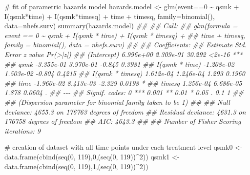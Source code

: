 \documentclass[
  10pt,
  a4paper,
]{book}
\newenvironment{Shaded}{\begin{snugshade}}{\end{snugshade}}
\newcommand{\AttributeTok}[1]{\textcolor[rgb]{0.40,0.45,0.13}{#1}}
\newcommand{\CommentTok}[1]{\textcolor[rgb]{0.37,0.37,0.37}{#1}}
\newcommand{\DecValTok}[1]{\textcolor[rgb]{0.68,0.00,0.00}{#1}}
\newcommand{\DocumentationTok}[1]{\textcolor[rgb]{0.37,0.37,0.37}{\textit{#1}}}
\newcommand{\FunctionTok}[1]{\textcolor[rgb]{0.28,0.35,0.67}{#1}}
\newcommand{\NormalTok}[1]{\textcolor[rgb]{0.00,0.46,0.62}{#1}}
\newcommand{\OtherTok}[1]{\textcolor[rgb]{0.00,0.46,0.62}{#1}}
\newcommand{\SpecialCharTok}[1]{\textcolor[rgb]{0.37,0.37,0.37}{#1}}
\begin{document}
\begin{Shaded}
\begin{Highlighting}[]
\CommentTok{\# fit of parametric hazards model}
\NormalTok{hazards.model }\OtherTok{\textless{}{-}} \FunctionTok{glm}\NormalTok{(event}\SpecialCharTok{==}\DecValTok{0} \SpecialCharTok{\textasciitilde{}}\NormalTok{ qsmk }\SpecialCharTok{+} \FunctionTok{I}\NormalTok{(qsmk}\SpecialCharTok{*}\NormalTok{time) }\SpecialCharTok{+} \FunctionTok{I}\NormalTok{(qsmk}\SpecialCharTok{*}\NormalTok{timesq) }\SpecialCharTok{+} 
\NormalTok{                       time }\SpecialCharTok{+}\NormalTok{ timesq, }\AttributeTok{family=}\FunctionTok{binomial}\NormalTok{(), }\AttributeTok{data=}\NormalTok{nhefs.surv)}
\FunctionTok{summary}\NormalTok{(hazards.model)}
\DocumentationTok{\#\# }
\DocumentationTok{\#\# Call:}
\DocumentationTok{\#\# glm(formula = event == 0 \textasciitilde{} qsmk + I(qsmk * time) + I(qsmk * timesq) + }
\DocumentationTok{\#\#     time + timesq, family = binomial(), data = nhefs.surv)}
\DocumentationTok{\#\# }
\DocumentationTok{\#\# Coefficients:}
\DocumentationTok{\#\#                    Estimate Std. Error z value Pr(\textgreater{}|z|)    }
\DocumentationTok{\#\# (Intercept)       6.996e+00  2.309e{-}01  30.292   \textless{}2e{-}16 ***}
\DocumentationTok{\#\# qsmk             {-}3.355e{-}01  3.970e{-}01  {-}0.845   0.3981    }
\DocumentationTok{\#\# I(qsmk * time)   {-}1.208e{-}02  1.503e{-}02  {-}0.804   0.4215    }
\DocumentationTok{\#\# I(qsmk * timesq)  1.612e{-}04  1.246e{-}04   1.293   0.1960    }
\DocumentationTok{\#\# time             {-}1.960e{-}02  8.413e{-}03  {-}2.329   0.0198 *  }
\DocumentationTok{\#\# timesq            1.256e{-}04  6.686e{-}05   1.878   0.0604 .  }
\DocumentationTok{\#\# {-}{-}{-}}
\DocumentationTok{\#\# Signif. codes:  0 \textquotesingle{}***\textquotesingle{} 0.001 \textquotesingle{}**\textquotesingle{} 0.01 \textquotesingle{}*\textquotesingle{} 0.05 \textquotesingle{}.\textquotesingle{} 0.1 \textquotesingle{} \textquotesingle{} 1}
\DocumentationTok{\#\# }
\DocumentationTok{\#\# (Dispersion parameter for binomial family taken to be 1)}
\DocumentationTok{\#\# }
\DocumentationTok{\#\#     Null deviance: 4655.3  on 176763  degrees of freedom}
\DocumentationTok{\#\# Residual deviance: 4631.3  on 176758  degrees of freedom}
\DocumentationTok{\#\# AIC: 4643.3}
\DocumentationTok{\#\# }
\DocumentationTok{\#\# Number of Fisher Scoring iterations: 9}

\CommentTok{\# creation of dataset with all time points under each treatment level}
\NormalTok{qsmk0 }\OtherTok{\textless{}{-}} \FunctionTok{data.frame}\NormalTok{(}\FunctionTok{cbind}\NormalTok{(}\FunctionTok{seq}\NormalTok{(}\DecValTok{0}\NormalTok{, }\DecValTok{119}\NormalTok{),}\DecValTok{0}\NormalTok{,(}\FunctionTok{seq}\NormalTok{(}\DecValTok{0}\NormalTok{, }\DecValTok{119}\NormalTok{))}\SpecialCharTok{\^{}}\DecValTok{2}\NormalTok{))}
\NormalTok{qsmk1 }\OtherTok{\textless{}{-}} \FunctionTok{data.frame}\NormalTok{(}\FunctionTok{cbind}\NormalTok{(}\FunctionTok{seq}\NormalTok{(}\DecValTok{0}\NormalTok{, }\DecValTok{119}\NormalTok{),}\DecValTok{1}\NormalTok{,(}\FunctionTok{seq}\NormalTok{(}\DecValTok{0}\NormalTok{, }\DecValTok{119}\NormalTok{))}\SpecialCharTok{\^{}}\DecValTok{2}\NormalTok{))}


\end{Highlighting}
\end{Shaded}
\end{document}
